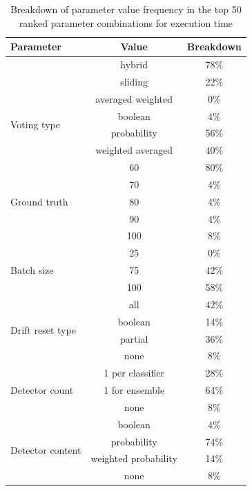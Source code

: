 \begin{table}[]
\centering
\caption{\label{table:rank_seconds_breakdown}Breakdown of parameter value frequency in the top 50 ranked parameter combinations for execution time}
\begin{tabular}{|l|c|c|}
\hline
\textbf{Parameter} & \textbf{Value} & \textbf{Breakdown} \\ \hline \hhline{===}
\multirow{2}{*}{Window type} & hybrid & 78\% \\ \cline{2-3} 
 & sliding & 22\% \\ \hline
\multirow{4}{*}{Voting type} & averaged weighted & 0\% \\ \cline{2-3} 
 & boolean & 4\% \\ \cline{2-3} 
 & probability & 56\% \\ \cline{2-3} 
 & weighted averaged & 40\% \\ \hline
\multirow{5}{*}{Ground truth} & 60 & 80\% \\ \cline{2-3} 
 & 70 & 4\% \\ \cline{2-3} 
 & 80 & 4\% \\ \cline{2-3} 
 & 90 & 4\% \\ \cline{2-3} 
 & 100 & 8\% \\ \hline
\multirow{3}{*}{Batch size} & 25 & 0\% \\ \cline{2-3} 
 & 75 & 42\% \\ \cline{2-3} 
 & 100 & 58\% \\ \hline
\multirow{4}{*}{Drift reset type} & all & 42\% \\ \cline{2-3} 
 & boolean & 14\% \\ \cline{2-3} 
 & partial & 36\% \\ \cline{2-3} 
 & none & 8\% \\ \hline
\multirow{3}{*}{Detector count} & 1 per classifier & 28\% \\ \cline{2-3} 
 & 1 for ensemble & 64\% \\ \cline{2-3} 
 & none & 8\% \\ \hline
\multicolumn{1}{|c|}{\multirow{4}{*}{Detector content}} & boolean & 4\% \\ \cline{2-3} 
\multicolumn{1}{|c|}{} & probability & 74\% \\ \cline{2-3} 
\multicolumn{1}{|c|}{} & weighted probability & 14\% \\ \cline{2-3} 
\multicolumn{1}{|c|}{} & none & 8\% \\ \hline
\end{tabular}
\end{table}

